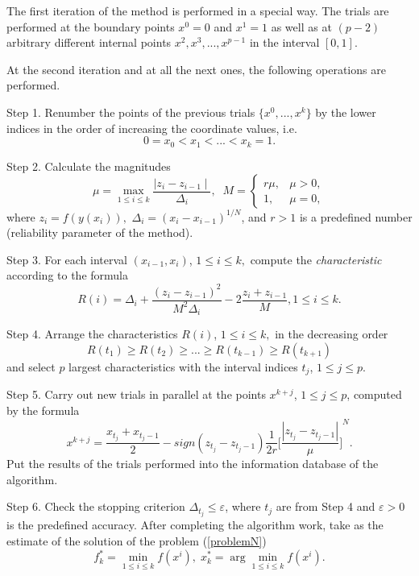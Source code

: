 \documentclass[runningheads]{llncs}
\begin{document}
The first iteration of the method is performed in a special way. The trials are performed at the boundary points $x^0 = 0$ and $x^1 = 1$ as well as at $(p-2)$ arbitrary different internal points $x^2, x^3, ..., x^{p-1}$ in the interval $[0,1]$.

At the second iteration and at all the next ones, the following operations are performed.

Step 1. Renumber the points of the previous trials $\{x^0,...,x^k\}$ by the lower indices in the order of increasing the coordinate values, i.e. 
$$ 0 = x_0 < x_1 < ... < x_k = 1.$$

Step 2. Calculate the magnitudes 
\begin{equation}\label{M}
\mu = \max\limits_{1 \leq i \leq k} \frac{\mid z_i - z_{i-1} \mid}{\Delta_i}, \;\;
M = \left\{ \begin{array}{ll}
                r\mu, & \textrm{$\mu > 0$,}\\
                1, & \textrm{$\mu = 0$},
  \end{array} \right.
\end{equation}
where $z_i = f(y(x_i)),$  $\Delta_i = {(x_i - x_{i-1})}^{1/N}$, and $r > 1$ is a predefined number (reliability parameter of the method).

Step 3. For each interval $(x_{i-1}, x_i)$, $1 \leq i \leq k,$ compute the \textit{characteristic} according to the formula
\begin{equation}\label{R}
R(i) = \Delta_i + \frac{(z_i - z_{i-1})^2}{M^2 \Delta_i} - 2 \frac{z_i + z_{i-1}}{M}, 1 \leq i \leq k. 
\end{equation} 

Step 4. Arrange the characteristics $R(i)$, $1 \leq i \leq k,$ in the decreasing order
\begin{equation} \label{OrderedR}
 R(t_1) \geq R(t_2) \geq ... \geq R(t_{k-1}) \geq R(t_{k+1}) 
\end{equation}
and select $p$ largest characteristics with the interval indices $t_j$, $1 \leq j \leq p$.

Step 5. Carry out new trials in parallel at the points $x^{k+j}$, $1 \leq j \leq p$, computed by the formula
$$ x^{k+j} = \frac{x_{t_j} + x_{t_j - 1}}{2} - sign(z_{t_j} - z_{t_j - 1}) \frac{1}{2r} {\Bigg[\frac{\left| z_{t_j} - z_{t_j - 1} \right|}{\mu}\Bigg]}^{N}.$$
Put the results of the trials performed into the information database of the algorithm.

Step 6. Check the stopping criterion $\Delta_{t_j} \leq \varepsilon$, where $t_j$ are from Step 4 and $\varepsilon > 0$ is the predefined accuracy. 
After completing the algorithm work, take as the estimate of the solution of the problem (\ref{problemN})
$$ f_k^* = \min\limits_{1 \leq i \leq k} f(x^i), \; x_k^* = \arg \min\limits_{1 \leq i \leq k} f(x^i).$$
\end{document}
